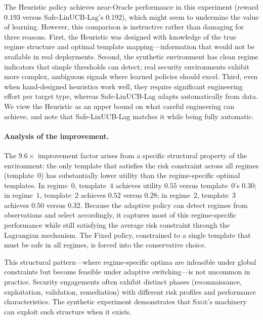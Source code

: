 \documentclass[sigconf,anonymous]{acmart}
\newcommand{\SAGE}{\textsc{Sage}\xspace}
\begin{document}
The Heuristic policy achieves near-Oracle performance in this experiment (reward $0.193$ versus Safe-LinUCB-Lag's $0.192$), which might seem to undermine the value of learning. However, this comparison is instructive rather than damaging for three reasons. First, the Heuristic was designed with knowledge of the true regime structure and optimal template mapping---information that would not be available in real deployments. Second, the synthetic environment has clean regime indicators that simple thresholds can detect; real security environments exhibit more complex, ambiguous signals where learned policies should excel. Third, even when hand-designed heuristics work well, they require significant engineering effort per target type, whereas Safe-LinUCB-Lag adapts automatically from data. We view the Heuristic as an upper bound on what careful engineering can achieve, and note that Safe-LinUCB-Lag matches it while being fully automatic.

\paragraph{Analysis of the improvement.} The $9.6\times$ improvement factor arises from a specific structural property of the environment: the only template that satisfies the risk constraint across all regimes (template~$0$) has substantially lower utility than the regime-specific optimal templates. In regime~$0$, template~$4$ achieves utility $0.55$ versus template~$0$'s $0.30$; in regime~$1$, template~$2$ achieves $0.52$ versus $0.28$; in regime~$2$, template~$3$ achieves $0.50$ versus $0.32$. Because the adaptive policy can detect regimes from observations and select accordingly, it captures most of this regime-specific performance while still satisfying the average risk constraint through the Lagrangian mechanism. The Fixed policy, constrained to a single template that must be safe in all regimes, is forced into the conservative choice.

This structural pattern---where regime-specific optima are infeasible under global constraints but become feasible under adaptive switching---is not uncommon in practice. Security engagements often exhibit distinct phases (reconnaissance, exploitation, validation, remediation) with different risk profiles and performance characteristics. The synthetic experiment demonstrates that \SAGE's machinery can exploit such structure when it exists.
\end{document}
